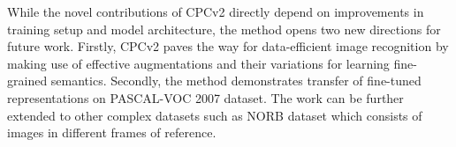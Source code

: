 \documentclass[11pt,letterpaper]{article}
\begin{document}
While the novel contributions of CPCv2 directly depend on improvements in training setup and model architecture, the method opens two new directions for future work. Firstly, CPCv2 paves the way for data-efficient image recognition by making use of effective augmentations and their variations for learning fine-grained semantics. Secondly, the method demonstrates transfer of fine-tuned representations on PASCAL-VOC 2007 dataset. The work can be further extended to other complex datasets such as NORB dataset which consists of images in different frames of reference. 
\end{document}
